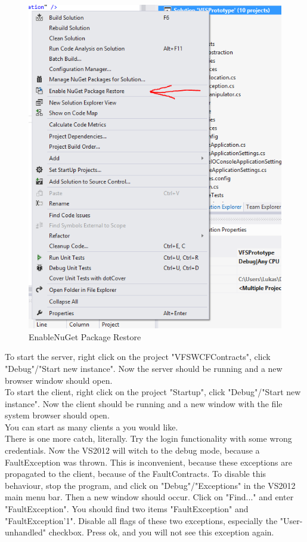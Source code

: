 \documentclass[JCDReport.tex]{subfiles}
\begin{document}
\begin{figure}[h!]
	\centering
	\includegraphics[scale=1]{Images/nuget_restore.png} 
	\caption{EnableNuGet Package Restore}
	\label{fig:nugetPackageRestore}
\end{figure}	

To start the server, right click on the project "VFSWCFContracts", click "Debug"/"Start new instance". Now the server should be running and a new browser window should open.\\

To start the client, right click on the project "Startup", click "Debug"/"Start new instance". Now the client should be running and a new window with the file system browser should open.\\

You can start as many clients a you would like.\\

There is one more catch, literally. Try the login functionality with some wrong credentials. Now the VS2012 will witch to the debug mode, because a FaultException was thrown. This is inconvenient, because these exceptions are propagated to the client, because of the FaultContracts. To disable this behaviour, stop the program, and click on "Debug"/"Exceptions" in the VS2012 main menu bar. Then a new window should occur. Click on "Find..." and enter "FaultException". You should find two items "FaultException" and "FaultException'1". Disable all flags of these two exceptions, especially the "User-unhandled" checkbox. Press ok, and you will not see this exception again.
\end{document}
